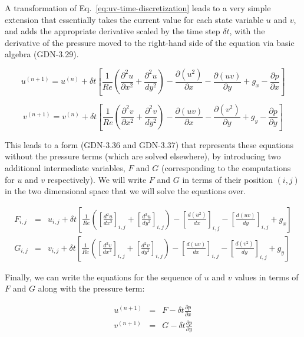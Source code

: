 A transformation
of Eq.~\ref{eq:uv-time-discretization} leads to a very simple
extension that essentially takes the current value for each state
variable $u$ and $v$, and adds the appropriate derivative scaled by
the time step $\delta t$, with the derivative of the pressure moved to
the right-hand side of the equation via basic algebra (GDN-3.29).

\begin{equation}
\label{eq:timestep_momentum_u}
u^{(n+1)} = u^{(n)} + \delta t \left[ \frac{1}{Re} \left(\frac{\partial^2 u}{\partial x^2} + \frac{\partial^2 u}{dy^2}\right) - \frac{\partial(u^2)}{\partial x} - \frac{\partial(uv)}{\partial y} + g_x - \frac{\partial p}{\partial x} \right]
\end{equation}

\begin{equation}
\label{eq:timestep_momentum_v}
v^{(n+1)} = v^{(n)} + \delta t \left[ \frac{1}{Re} \left(\frac{\partial^2 v}{\partial x^2} + \frac{\partial^2 v}{dy^2}\right) - \frac{\partial(uv)}{\partial x} - \frac{\partial(v^2)}{\partial y} + g_y - \frac{\partial p}{\partial y} \right]
\end{equation}

This leads to a form (GDN-3.36 and GDN-3.37) that represents these
equations without the pressure terms (which are solved elsewhere), by
introducing two additional intermediate variables, $F$ and $G$
(corresponding to the computations for $u$ and $v$ respectively).  We
will write $F$ and $G$ in terms of their position $(i,j)$ in the two
dimensional space that we will solve the equations over.

\begin{eqnarray}
\label{eq:momentum_f}
F_{i,j} & = & u_{i,j} + \delta t \left[ \frac{1}{Re} \left( \left[ \frac{d^2u}{dx^2} \right]_{i,j} + \left[ \frac{d^2u}{dy^2} \right]_{i,j} \right) - \left[ \frac{d(u^2)}{dx} \right]_{i,j} - \left[ \frac{d(uv)}{dy} \right]_{i,j} + g_x \right] \\
\label{eq:momentum_g}
G_{i,j} & = & v_{i,j} + \delta t \left[ \frac{1}{Re} \left( \left[ \frac{d^2v}{dx^2} \right]_{i,j} + \left[ \frac{d^2v}{dy^2} \right]_{i,j} \right) - \left[ \frac{d(uv)}{dx} \right]_{i,j} - \left[ \frac{d(v^2)}{dy} \right]_{i,j} + g_y \right]
\end{eqnarray}

Finally, we can write the equations for the sequence of $u$ and $v$ values 
in terms of $F$ and $G$ along with the pressure term:

\begin{eqnarray}
u^{(n+1)} & = & F - \delta t \frac{\partial p}{\partial x} \nonumber \\
v^{(n+1)} & = & G - \delta t \frac{\partial p}{\partial y}
\end{eqnarray}

